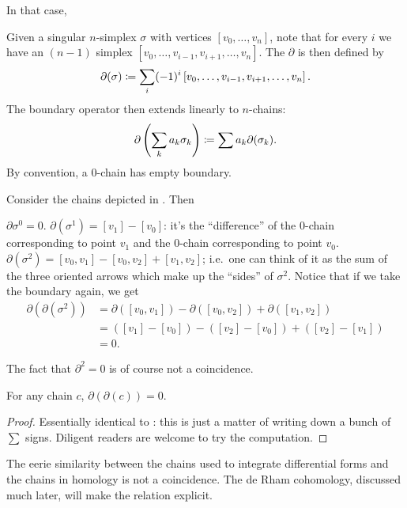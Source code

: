 In that case,
\begin{definition}
	Given a singular $n$-simplex $\sigma$ with vertices $[v_0, \dots, v_n]$,
	note that for every $i$ we have an $(n-1)$ simplex $[v_0, \dots, v_{i-1}, v_{i+1}, \dots, v_n]$.
	The  $\partial$ is then defined by
	\[ \partial(\sigma) \coloneqq \sum_i (-1)^i
		\left[ v_0, \dots, v_{i-1}, v_{i+1}, \dots, v_n \right]. \]
	The boundary operator then extends linearly to $n$-chains:
	\[ \partial\left( \sum_k a_k \sigma_k \right) \coloneqq \sum a_k \partial(\sigma_k). \]
	By convention, a $0$-chain has empty boundary.
\end{definition}
\begin{example}
	Consider the chains depicted in . Then
	\begin{enumerate}[(a)]
		\ii $\partial\sigma^0 = 0$.
		\ii $\partial(\sigma^1) = [v_1] - [v_0]$:
		it's the ``difference'' of the $0$-chain corresponding to point $v_1$
		and the $0$-chain corresponding to point $v_0$.
		\ii $\partial(\sigma^2) = [v_0,v_1] - [v_0,v_2] + [v_1, v_2]$;
		i.e.\ one can think of it as the sum of the three oriented arrows
		which make up the ``sides'' of $\sigma^2$.
		\ii Notice that if we take the boundary again, we get
		\begin{align*}
			\partial(\partial(\sigma^2))
			&= \partial([v_0,v_1]) - \partial([v_0,v_2]) + \partial([v_1,v_2]) \\
			&= \left( [v_1]-[v_0] \right) - \left( [v_2]-[v_0] \right) + \left( [v_2]-[v_1] \right)  \\
			&= 0.
		\end{align*}
	\end{enumerate}
\end{example}

The fact that $\partial^2 = 0$ is of course not a coincidence.
\begin{theorem}
	[$\partial^2=0$]
	For any chain $c$, $\partial(\partial(c)) = 0$.
\end{theorem}
\begin{proof}
	Essentially identical to :
	this is just a matter of writing down a bunch of $\sum$ signs.
	Diligent readers are welcome to try the computation.
\end{proof}
\begin{remark}
	The eerie similarity between the chains used to integrate differential forms
	and the chains in homology is not a coincidence.
	The de Rham cohomology, discussed much later, will make the relation explicit.
\end{remark}

